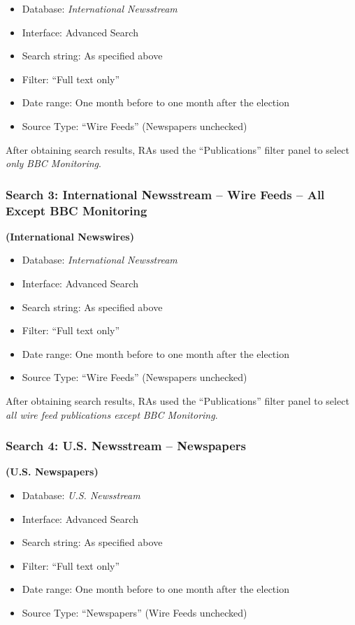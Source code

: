 \documentclass[USletter,12pt, titlepage]{article} %
\begin{document}
\begin{itemize}
    \item Database: \textit{International Newsstream}
    \item Interface: Advanced Search
    \item Search string: As specified above
    \item Filter: ``Full text only''
    \item Date range: One month before to one month after the election
    \item Source Type: ``Wire Feeds'' (Newspapers unchecked)
\end{itemize}

After obtaining search results, RAs used the ``Publications'' filter panel to select \emph{only} \textit{BBC Monitoring}. 

\subsubsection{Search 3: International Newsstream -- Wire Feeds -- All Except BBC Monitoring} \textbf{(International Newswires)}

\begin{itemize}
    \item Database: \textit{International Newsstream}
    \item Interface: Advanced Search
    \item Search string: As specified above
    \item Filter: ``Full text only''
    \item Date range: One month before to one month after the election
    \item Source Type: ``Wire Feeds'' (Newspapers unchecked)
\end{itemize}

After obtaining search results, RAs used the ``Publications'' filter panel to select \emph{all wire feed publications except} \textit{BBC Monitoring}.

\subsubsection{Search 4: U.S. Newsstream -- Newspapers} \textbf{(U.S. Newspapers)}

\begin{itemize}
    \item Database: \textit{U.S. Newsstream}
    \item Interface: Advanced Search
    \item Search string: As specified above
    \item Filter: ``Full text only''
    \item Date range: One month before to one month after the election
    \item Source Type: ``Newspapers'' (Wire Feeds unchecked)
\end{itemize}
\end{document}

